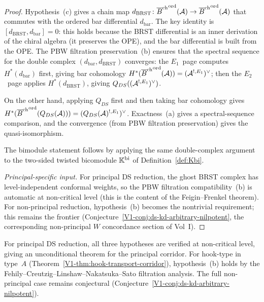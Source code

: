 \begin{proof}
Hypothesis~(c) gives a chain map
$d_{\mathrm{BRST}}\colon {\overline{B}^{\mathrm{ch}}}^{\mathrm{ord}}(\mathcal{A})
\to {\overline{B}^{\mathrm{ch}}}^{\mathrm{ord}}(\mathcal{A})$
that commutes with the ordered bar differential $d_{\mathrm{bar}}$.
The key identity is
$[d_{\mathrm{BRST}}, d_{\mathrm{bar}}] = 0$:
this holds because the BRST differential is an inner derivation of
the chiral algebra (it preserves the OPE), and the bar differential
is built from the OPE. The PBW filtration preservation~(b) ensures
that the spectral sequence for the double complex
$(d_{\mathrm{bar}}, d_{\mathrm{BRST}})$ converges: the $E_1$~page
computes $H^*(d_{\mathrm{bar}})$ first, giving bar cohomology
$H^*({\overline{B}^{\mathrm{ch}}}^{\mathrm{ord}}(\mathcal{A})) = (\mathcal{A}^{!,E_1})^\vee$; then the
$E_2$~page applies $H^*(d_{\mathrm{BRST}})$, giving
$Q_{DS}((\mathcal{A}^{!,E_1})^\vee)$.

On the other hand, applying $Q_{DS}$ first and then taking bar
cohomology gives $H^*({\overline{B}^{\mathrm{ch}}}^{\mathrm{ord}}(Q_{DS}(\mathcal{A})))
= (Q_{DS}(\mathcal{A})^{!,E_1})^\vee$. Exactness~(a) gives
a spectral-sequence comparison, and the convergence (from PBW
filtration preservation) gives the quasi-isomorphism.

The bimodule statement follows by applying the same double-complex
argument to the two-sided twisted bicomodule $\mathbb{K}^{\mathrm{bi}}$
of Definition~\ref{def:Kbi}.

\emph{Principal-specific input.}
For principal DS reduction, the ghost BRST complex has
level-independent conformal weights, so the PBW filtration
compatibility~(b) is automatic at non-critical level (this is the
content of the Feigin--Frenkel theorem). For non-principal
reduction, hypothesis~(b) becomes the nontrivial requirement;
this remains the frontier
(Conjecture~\ref*{V1-conj:ds-kd-arbitrary-nilpotent},
the corresponding non-principal $W$ concordance section of Vol~I).
\end{proof}

\begin{remark}
For principal DS reduction, all three hypotheses are verified
at non-critical level, giving an unconditional theorem for the
principal corridor. For hook-type in type~$A$
(Theorem~\ref*{V1-thm:hook-transport-corridor}), hypothesis~(b) holds
by the Fehily--Creutzig--Linshaw--Nakatsuka--Sato filtration analysis.
The full non-principal case
remains conjectural
(Conjecture~\ref*{V1-conj:ds-kd-arbitrary-nilpotent}).
\end{remark}

